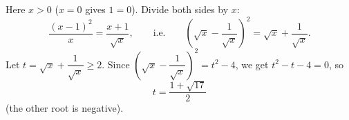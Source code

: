 Here $x>0$ ($x=0$ gives $1=0$). Divide both sides by $x$:
\[\dfrac{(x-1)^2}{x}=\dfrac{x+1}{\sqrt x},\qquad\text{i.e.}\qquad\left(\sqrt x-\dfrac{1}{\sqrt x}\right)^2=\sqrt x+\dfrac{1}{\sqrt x}.\]
Let $t=\sqrt x+\dfrac{1}{\sqrt x}\ge2$. Since $\left(\sqrt x-\dfrac{1}{\sqrt x}\right)^2=t^2-4$, we get $t^2-t-4=0$, so
\[t=\boxed{\dfrac{1+\sqrt{17}}{2}}\]
(the other root is negative).
